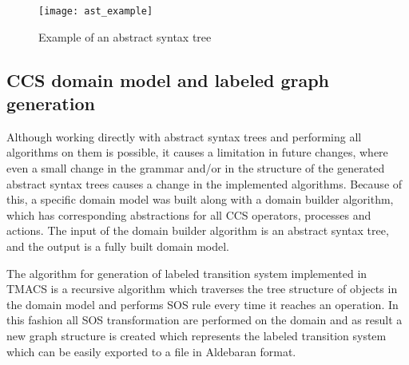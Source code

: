 \begin{figure}[h]
\centering
\texttt{[image: ast\_example]}
\caption{Example of an abstract syntax tree}
\label{fig:ast_example}
\end{figure}

\subsection{CCS domain model and labeled graph generation}
Although working directly with abstract syntax trees and performing all algorithms on them is possible, it causes 
a limitation in future changes, where even a small change in the grammar and/or in the structure of the
generated abstract syntax trees causes a change in the implemented algorithms. Because of this,
a specific domain model was built along with a domain builder algorithm, which has corresponding
abstractions for all CCS operators, processes and actions. The input of the domain builder algorithm 
is an abstract syntax tree, and the output is a fully built domain model. 

The algorithm for generation of labeled transition system implemented in TMACS is a recursive algorithm which 
traverses the tree structure of objects in the domain model and performs SOS rule every time it reaches an operation.
In this fashion all SOS transformation are performed on the domain and as result a new graph
structure is created which represents the labeled transition system which can be easily exported to a file
in Aldebaran format.



